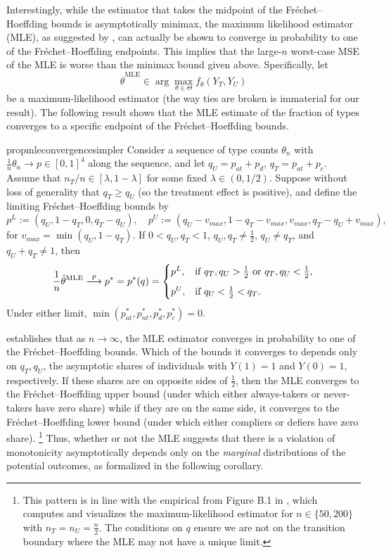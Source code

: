 \documentclass[12pt,reqno]{amsart}
\begin{document}
Interestingly, while the estimator that takes the midpoint of the Fr\'echet--Hoeffding bounds is asymptotically minimax, the maximum likelihood estimator (MLE), as suggested by \citet{christy_counting_2025}, can actually be shown to converge in probability to one of the Fr\'echet--Hoeffding endpoints. This implies that the large-$n$ worst-case MSE of the MLE is worse than the minimax bound given above. Specifically, let
\[
\hat{\theta}^{\text{MLE}} \in \arg\max_{\theta \in \Theta} f_\theta(Y_T, Y_U)
\]
be a maximum-likelihood estimator (the way ties are broken is immaterial for our result). The following result shows that the MLE estimate of the fraction of types converges to a specific endpoint of the Fr\'echet--Hoeffding bounds.

\begin{restatable}{prop}{mleconvergencesimpler}
\label{prop:mleconvergencesimpler}
Consider a sequence of type counts $\theta_n$ with $\tfrac{1}{n} \theta_n \rightarrow p
\in [0,1]^4$ along the sequence, and let $q_U = p_{at} + p_{d}$, $q_T = p_{at} + p_c$.
Assume that $n_T/n \in [\lambda, 1-\lambda]$ for some fixed $\lambda \in (0, 1/2)$. 
Suppose without loss of generality that $q_T \geq q_U$ (so the treatment
effect is positive), and define the limiting Fr\'echet--Hoeffding bounds by $$p^L := (q_U, 1{-}q_T, 0, q_T {-} q_U),  \quad p^U := (q_U{-}v_{max}, 1{-}q_T{-}v_{max}, v_{max}, q_T {-} q_U {+} v_{max}),$$ for $v_{max} = \min(q_U,1{-}q_T)$. If $0 {<} q_U,q_T {<} 1$, $q_U, q_T \neq \tfrac{1}{2}$, $q_U \neq q_T$, and $q_U {+} q_T \neq 1$, then
\[
\frac{1}{n}\hat{\theta}^{\mathrm{MLE}}
\overset{p}{\longrightarrow}  p^* = p^*(q) =
\begin{cases}
p^L,
& \text{if } q_T, q_U > \tfrac{1}{2} \text{ or } q_T, q_U < \tfrac{1}{2}, \\[6pt]
p^U,
& \text{if } q_U < \tfrac{1}{2} < q_T.
\end{cases}
\]
Under either limit, $\min(p^*_{at},p^*_{nt},p^*_d,p^*_c) = 0$.
\end{restatable}

 establishes that as $n \to \infty$, the MLE estimator converges in probability to one of the Fr\'echet--Hoeffding bounds. Which of the bounds it converges to depends only on $q_T,q_U$, the asymptotic shares of individuals with $Y(1)=1$ and $Y(0)=1$, respectively. If these shares are on opposite sides of $\frac{1}{2}$, then the MLE converges to the Fr\'echet--Hoeffding upper bound (under which either always-takers or never-takers have zero share) while if they are on the same side, it converges to the Fr\'echet--Hoeffding lower bound (under which either compliers or defiers have zero share).%
\footnote{
    This pattern is in line with the empirical from Figure B.1 in \citet{christy_counting_2025}, which computes and visualizes the maximum-likelihood estimator for $n \in \{50,200\}$ with $n_T = n_U = \tfrac{n}{2}$. The conditions on $q$ ensure we are not on the transition boundary where the MLE may not have a unique limit.}
Thus, whether or not the MLE suggests that there is a violation of monotonicity asymptotically depends only on the \emph{marginal} distributions of the potential outcomes, as formalized in the following corollary.
\end{document}
